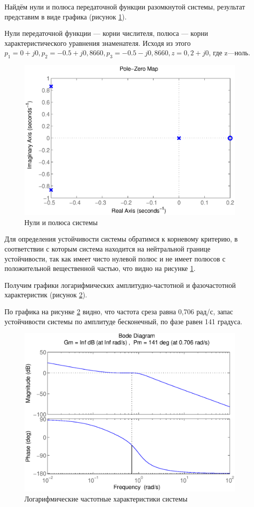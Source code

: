 \documentclass[a4paper,12pt]{article} %
\begin{document}
Найдём нули и полюса передаточной функции разомкнутой системы, результат представим в виде графика (рисунок \ref{pzmap}).\par
Нули передаточной функции --- корни числителя, полюса --- корни характеристического уравнения знаменателя. Исходя из этого $p_1=0+j0, p_2=-0.5+j0,8660, p_3=-0.5-j0,8660, z=0,2+j0$, где z---ноль.
\begin{figure}[ht!]
	\centering
	\includegraphics[width=1\linewidth]{scheme/pzmap}
	\caption{Нули и полюса системы}
	\label{pzmap}
\end{figure}\par
Для определения устойчивости системы обратимся к корневому критерию, в соответствии с которым система находится на нейтральной границе устойчивости, так как имеет чисто нулевой полюс и не имеет полюсов с положительной вещественной частью, что видно на рисунке \ref{pzmap}.

Получим графики логарифмических амплитудно-частотной и фазочастотной характеристик (рисунок \ref{bode}).\par
По графика на рисунке \ref{bode} видно, что частота среза равна 0,706 рад/с, запас устойчивости системы по амплитуде бесконечный, по фазе равен 141 градуса.
\begin{figure}[H]
	\centering
	\includegraphics[width=0.9\linewidth]{scheme/bode}
	\caption{Логарифмические частотные характеристики системы}
	\label{bode}
\end{figure}
\end{document}
